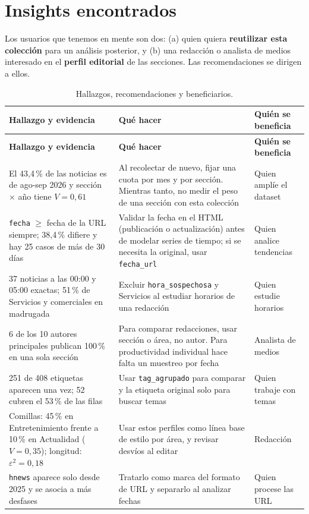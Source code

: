 \documentclass[12pt,a4paper]{article}
\begin{document}
\section{Insights encontrados}
Los usuarios que tenemos en mente son dos: (a) quien quiera \textbf{reutilizar esta colección} para un análisis posterior, y (b) una redacción o analista de medios interesado en el \textbf{perfil editorial} de las secciones. Las recomendaciones se dirigen a ellos.

{\small
\begin{longtable}{p{5.0cm}p{6.2cm}p{3.3cm}}
\caption{Hallazgos, recomendaciones y beneficiarios.}\\
\toprule
\textbf{Hallazgo y evidencia} & \textbf{Qué hacer} & \textbf{Quién se beneficia}\\\midrule
\endfirsthead
\toprule
\textbf{Hallazgo y evidencia} & \textbf{Qué hacer} & \textbf{Quién se beneficia}\\\midrule
\endhead
El 43,4\,\% de las noticias es de ago-sep 2026 y sección × año tiene $V = 0{,}61$ & Al recolectar de nuevo, fijar una cuota por mes y por sección. Mientras tanto, no medir el peso de una sección con esta colección & Quien amplíe el dataset\\
\texttt{fecha} $\ge$ fecha de la URL siempre; 38,4\,\% difiere y hay 25 casos de más de 30 días & Validar la fecha en el HTML (publicación o actualización) antes de modelar series de tiempo; si se necesita la original, usar \texttt{fecha\_url} & Quien analice tendencias\\
37 noticias a las 00:00 y 05:00 exactas; 51\,\% de Servicios y comerciales en madrugada & Excluir \texttt{hora\_sospechosa} y Servicios al estudiar horarios de una redacción & Quien estudie horarios\\
6 de los 10 autores principales publican 100\,\% en una sola sección & Para comparar redacciones, usar sección o área, no autor. Para productividad individual hace falta un muestreo por fecha & Analista de medios\\
251 de 408 etiquetas aparecen una vez; 52 cubren el 53\,\% de las filas & Usar \texttt{tag\_agrupado} para comparar y la etiqueta original solo para buscar temas & Quien trabaje con temas\\
Comillas: 45\,\% en Entretenimiento frente a 10\,\% en Actualidad ($V = 0{,}35$); longitud: $\varepsilon^2 = 0{,}18$ & Usar estos perfiles como línea base de estilo por área, y revisar desvíos al editar & Redacción\\
\texttt{hnews} aparece solo desde 2025 y se asocia a más desfases & Tratarlo como marca del formato de URL y separarlo al analizar fechas & Quien procese las URL\\
\bottomrule
\end{longtable}
}
\end{document}
